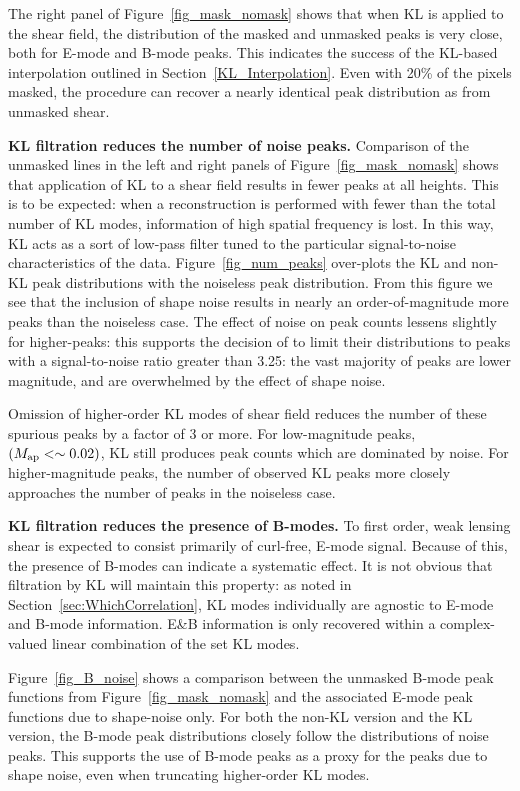 The right panel of Figure~\ref{fig_mask_nomask} shows that when 
KL is applied to the shear field, the distribution of the masked and
unmasked peaks is very close, both for E-mode and B-mode peaks.
This indicates the success of the KL-based interpolation outlined in
Section~\ref{KL_Interpolation}.  Even with 20\% of the pixels masked,
the procedure can recover a nearly identical peak distribution as 
from unmasked shear.

\textbf{KL filtration reduces the number of noise peaks.}
Comparison of the unmasked lines in the left and right panels of 
Figure~\ref{fig_mask_nomask} shows that application of KL to a shear
field results in fewer peaks at all heights.  This is to be expected:
when a reconstruction is performed with fewer than the total number
of KL modes, information of high spatial frequency is lost.  In this
way, KL acts as a sort of low-pass filter tuned to the particular
signal-to-noise characteristics of the data.  Figure~\ref{fig_num_peaks}
over-plots the KL and non-KL peak distributions with the noiseless
peak distribution.  From this figure we see that the inclusion of
shape noise results in nearly an order-of-magnitude more peaks than 
the noiseless case.  The effect of noise on peak counts lessens slightly 
for higher-\Map peaks: this supports the decision of \citet{Dietrich10} 
to limit their distributions to peaks with a signal-to-noise 
ratio greater than 3.25: the vast majority of peaks are lower 
magnitude, and are overwhelmed by the effect of shape noise.

Omission of higher-order KL modes of shear field reduces the number of
these spurious peaks by a factor of 3 or more.  For low-magnitude peaks,
$(M_{\rm ap}<\sim 0.02)$, KL still produces peak counts which are 
dominated by noise. For higher-magnitude peaks, the number of observed 
KL peaks more closely approaches the number of peaks in the noiseless case.

\textbf{KL filtration reduces the presence of B-modes.}
To first order, weak lensing shear is expected to consist primarily of
curl-free, E-mode signal.  Because of this, the presence of B-modes can
indicate a systematic effect.  It is not obvious that filtration by KL
will maintain this property: as noted in Section~\ref{sec:WhichCorrelation},
KL modes individually are agnostic to E-mode and B-mode information.  
E\&B information is only recovered within a 
complex-valued linear combination of the set KL modes.

Figure~\ref{fig_B_noise} shows a comparison between the unmasked
B-mode peak functions from Figure~\ref{fig_mask_nomask} and the associated
E-mode peak functions due to shape-noise only.  For both the non-KL version
and the KL version, the B-mode peak distributions closely follow the
distributions of noise peaks.  This supports the use of B-mode peaks as
a proxy for the peaks due to shape noise, even when truncating higher-order
KL modes.

